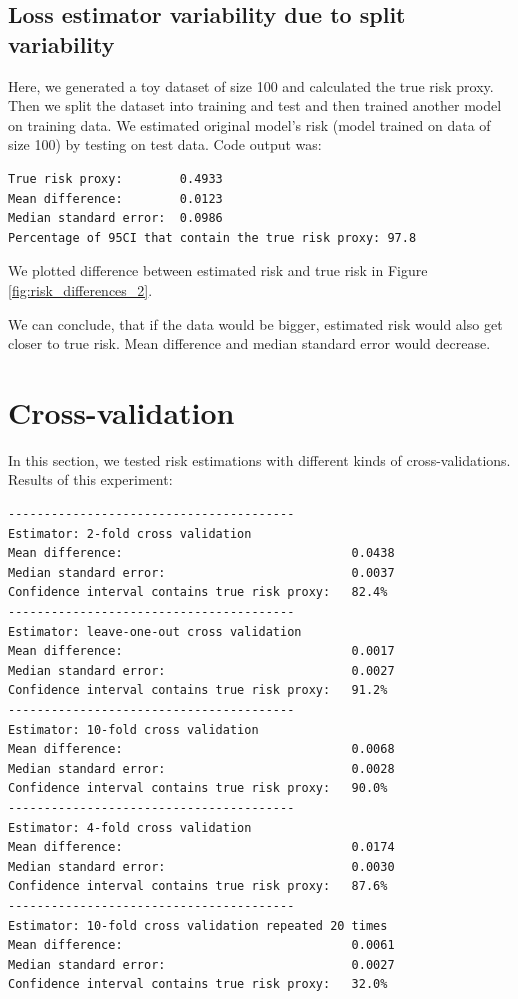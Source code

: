 \documentclass{article}
\begin{document}
\subsection{Loss estimator variability due to split variability}

Here, we generated a toy dataset of size 100 and calculated the true risk proxy. Then we split the dataset into training and test and then trained another model on training data. We estimated original model's risk (model trained on data of size 100) by testing on test data. Code output was:


\begin{lstlisting}[basicstyle=\small\ttfamily]
True risk proxy:        0.4933
Mean difference:        0.0123
Median standard error:  0.0986
Percentage of 95CI that contain the true risk proxy: 97.8
\end{lstlisting}

We plotted difference between estimated risk and true risk in Figure \ref{fig:risk_differences_2}.


We can conclude, that if the data would be bigger, estimated risk would also get closer to true risk. Mean difference and median standard error would decrease.

\section{Cross-validation}

In this section, we tested risk estimations with different kinds of cross-validations. Results of this experiment:

\begin{lstlisting}[basicstyle=\small\ttfamily]
----------------------------------------
Estimator: 2-fold cross validation
Mean difference:                                0.0438
Median standard error:                          0.0037
Confidence interval contains true risk proxy:   82.4%
----------------------------------------
Estimator: leave-one-out cross validation
Mean difference:                                0.0017
Median standard error:                          0.0027
Confidence interval contains true risk proxy:   91.2%
----------------------------------------
Estimator: 10-fold cross validation
Mean difference:                                0.0068
Median standard error:                          0.0028
Confidence interval contains true risk proxy:   90.0%
----------------------------------------
Estimator: 4-fold cross validation
Mean difference:                                0.0174
Median standard error:                          0.0030
Confidence interval contains true risk proxy:   87.6%
----------------------------------------
Estimator: 10-fold cross validation repeated 20 times
Mean difference:                                0.0061
Median standard error:                          0.0027
Confidence interval contains true risk proxy:   32.0%
\end{lstlisting}
\end{document}
